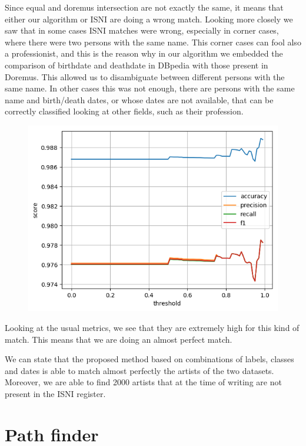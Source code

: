 \documentclass[paper=a4, fontsize=11pt]{scrartcl}
\begin{document}
Since equal and doremus intersection are not exactly the same, it means that either our algorithm or ISNI are doing a wrong match. Looking more closely we saw that in some cases ISNI matches were wrong, especially in corner cases, where there were two persons with the same name.
This corner cases can fool also a professionist, and this is the reason why in our algorithm we embedded the comparison of birthdate and deathdate in DBpedia with those present in Doremus. This allowed us to disambiguate between different persons with the same name. In other cases this was not enough, there are persons with the same name and birth/death dates, or whose dates are not available, that can be correctly classified looking at other fields, such as their profession.


\begin{figure}
\centering
\includegraphics[]{images/metrics_artists.png}\\
\end{figure}
Looking at the usual metrics, we see that they are extremely high for this kind of match. This means that we are doing an almost perfect match.

We can state that the proposed method based on combinations of labels, classes and dates is able to match almost perfectly the artists of the two datasets. Moreover, we are able to find 2000 artists that at the time of writing are not present in the ISNI register.

\section{Path finder}
\end{document}
